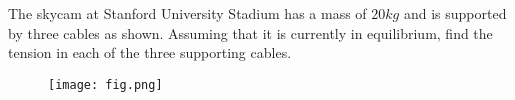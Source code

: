 
The skycam at Stanford University Stadium has a mass of $20 kg$ and is supported by three cables as shown. Assuming that it is currently in equilibrium, find the tension in each of the three supporting cables.

\begin{figure}[ht!]
  \centering
  \texttt{[image: fig.png]}
\end{figure}

\iftoggle{flagSoln}{%
\vspace{.5cm}
\rule{\textwidth}{.4pt}
\vspace{.5cm}
\textbf{Solution:}
\begin{figure}[ht!]
  \centering
  \texttt{[image: soln.png]}
\end{figure}
}{%
}%
